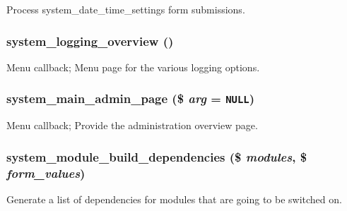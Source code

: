Process system\_\-date\_\-time\_\-settings form submissions. \hypertarget{system_8admin_8inc_7d827c89cc40bcc621fcb97310cdc5a6}{
\subsubsection[{system\_\-logging\_\-overview}]{\setlength{\rightskip}{0pt plus 5cm}system\_\-logging\_\-overview ()}}
\label{system_8admin_8inc_7d827c89cc40bcc621fcb97310cdc5a6}


Menu callback; Menu page for the various logging options. \hypertarget{system_8admin_8inc_b11f14a0765894140af08173415eea1d}{
\subsubsection[{system\_\-main\_\-admin\_\-page}]{\setlength{\rightskip}{0pt plus 5cm}system\_\-main\_\-admin\_\-page (\$ {\em arg} = {\tt NULL})}}
\label{system_8admin_8inc_b11f14a0765894140af08173415eea1d}


Menu callback; Provide the administration overview page. \hypertarget{system_8admin_8inc_17907af33561392a7fae5630b9a850c6}{
\subsubsection[{system\_\-module\_\-build\_\-dependencies}]{\setlength{\rightskip}{0pt plus 5cm}system\_\-module\_\-build\_\-dependencies (\$ {\em modules}, \/  \$ {\em form\_\-values})}}
\label{system_8admin_8inc_17907af33561392a7fae5630b9a850c6}


Generate a list of dependencies for modules that are going to be switched on.

